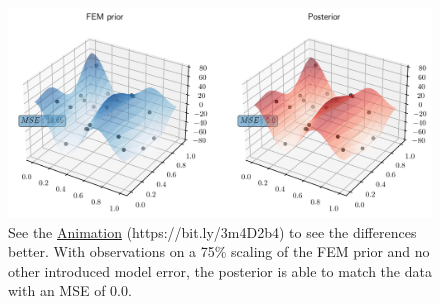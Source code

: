 \documentclass[%
  a4paper,oneside,%
  11pt,%
  smallchapters,
  style=printdev,
  extramargin,
  green,%
  rgb, <cmyk>
  ]{tubsbook}
\begin{document}
\begin{figure}[!ht]
\includegraphics[width=1\textwidth]{../../Python/Results/2D/75procent_no_d/3dMSE.pdf}
\centering
\caption[Comparison of prior and posterior in a 3D view for the 0.75x scaling]{See the \href{https://github.com/herluc/Masterarbeit/blob/master/MA_LucasHermann/Python/Results/2D/75procent_no_d/3DMSE.gif}{Animation} (https://bit.ly/3m4D2b4) to see the differences better. With observations on a 75\% scaling of the FEM prior and no other introduced model error, the posterior is able to match the data with an MSE of $0.0$. }
\label{fig:75proc_no_d3d}
\end{figure}

\FloatBarrier
\end{document}
